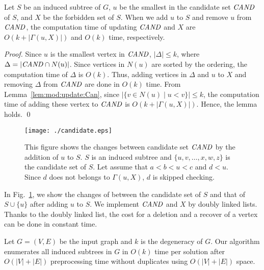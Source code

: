 \documentclass{llncs}
\newcommand{\set}[1]{\{#1\}}
\newcommand{\inset}[2]{\{#1\;|\;#2\}}
\newcommand{\Can}{{\it CAND}}
\begin{document}
\begin{lemma}
    \label{lem:mod:update:Can:X}
    Let $S$ be an induced subtree of $G$, 
    $u$ be the smallest in the candidate set $\Can$ of $S$, 
    and $X$ be the forbidden set of $S$.  
    When we add $u$ to $S$ and remove $u$ from $\Can$, 
    the computation time of updating $\Can$ and $X$ are
    $O(k + |\Gamma(u, X)|)$ and $O(k)$ time, respectively.  
\end{lemma}

\begin{proof}
    Since $u$ is the smallest vertex in $\Can$, 
    $|\Delta| \le k$, 
    where $\Delta = |\Can \cap N(u)|$. 
    Since vertices in $N(u)$ are sorted by the ordering, 
    the computation time of $\Delta$ is $O(k)$. 
    Thus, 
    adding vertices in $\Delta$ and $u$ to $X$ 
    and removing $\Delta$ from $\Can$ are done in $O(k)$ time. 
From Lemma~\ref{lem:mod:update:Can}, 
    since $|\inset{v \in N(u)}{u < v}| \le k$, 
    the computation time of adding these vertex to $\Can$ is $O(k + |\Gamma(u, X)|)$. 
Hence, the lemma holds. 
    \qed 
\end{proof}



\begin{figure}[t]
    \begin{center}
        \texttt{[image: ./candidate.eps]}
        \caption{
            This figure shows the changes between candidate set $\Can$ 
            by the addition of $u$ to $S$. 
            $S$ is an induced subtree and 
            $\set{u, v, \dots, x, w, z}$ is the candidate set of $S$. 
            Let assume that $a < b < u < c$ and $d < u$. 
            Since $d$ does not belongs to $\Gamma(u, X)$, 
            $d$ is skipped checking. 
        }
        \label{img:candidate}
    \end{center}
\end{figure}


In Fig.~\ref{img:candidate}, 
we show the changes of between 
the candidate set of $S$ and that of $S\cup\set{u}$ 
after adding $u$ to $S$. 
We implement $\Can$ and $X$  by doubly linked lists. 
Thanks to the doubly linked list, 
the cost for a deletion and a recover of a vertex 
can be done in constant time. 


\begin{theorem}
    \label{thm:complexity}
    Let $G = (V, E)$ be the input graph and $k$ is the degeneracy of $G$. 
    Our algorithm enumerates all induced subtrees in $G$ 
    in $O(k)$ time per solution 
    after $O(|V|+|E|)$ preprocessing time without duplicates 
    using $O(|V|+|E|)$ space. 
\end{theorem}
\end{document}
